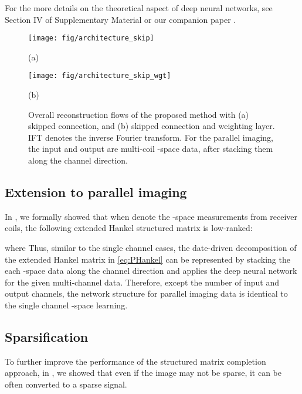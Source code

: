 \documentclass[10pt,journal]{IEEEtran}
\newcommand{\0}{{\boldsymbol{0}}}
\begin{document}
For the more details on the theoretical aspect of  deep neural networks, see  Section IV of Supplementary Material
or our companion paper \cite{ye2019cnn}.






\begin{figure}[!t] 	
\centerline{\texttt{[image: fig/architecture\_skip]}}
\vspace*{-0.7cm}
\centerline{\mbox{(a)}}
\vspace*{0.2cm}
\centerline{\texttt{[image: fig/architecture\_skip\_wgt]}}
\vspace*{-0.7cm}
\centerline{\mbox{(b)}}
\caption{Overall reconstruction flows of the proposed method with (a) skipped connection, and (b) skipped connection and weighting layer. IFT denotes the inverse Fourier transform. For the parallel imaging, the input and output are multi-coil -space data, after stacking them along
the channel direction. }
\label{fig:architecture}
\end{figure}

\subsection{Extension to parallel imaging}

In \cite{jin2016general}, we formally showed that when
 denote the -space measurements from  receiver coils,
the following extended Hankel structured matrix is low-ranked:

where 
Thus, similar to the single channel cases, the date-driven decomposition of the extended Hankel 
matrix in \eqref{eq:PHankel} can be represented by stacking the each -space data along the channel
direction and applies the deep neural network for the given multi-channel data.
Therefore, except the number of input and output channels,  the network
structure for parallel imaging data is  identical to the single channel -space learning. 






\subsection{Sparsification}


To further improve the performance of the structured matrix completion approach, in \cite{ye2016compressive}, we showed that 
even if the image  may not be sparse,   it can be often converted to a sparse signal.
\end{document}
